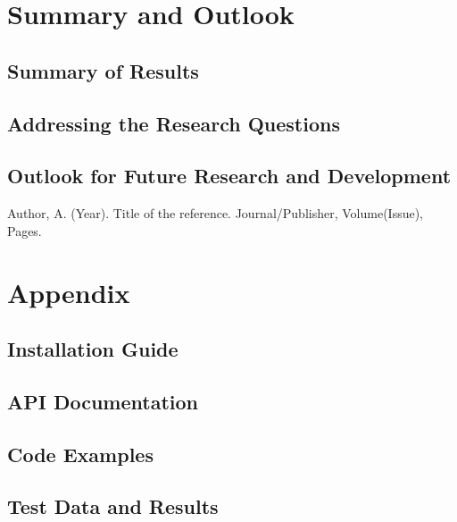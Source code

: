 \documentclass{article}
\begin{document}
\newpage

\section{Summary and Outlook}

\subsection{Summary of Results}
\subsection{Addressing the Research Questions}
\subsection{Outlook for Future Research and Development}

\newpage

\begin{thebibliography}{99}
 Author, A. (Year). Title of the reference. Journal/Publisher, Volume(Issue), Pages.
\end{thebibliography}

\newpage

\appendix
\section*{Appendix}
\subsection*{Installation Guide}
\subsection*{API Documentation}
\subsection*{Code Examples}
\subsection*{Test Data and Results}
\end{document}
